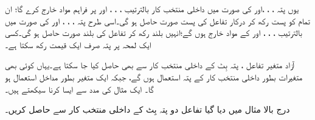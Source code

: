 یوں پتہ ، ، ،اور   کی صورت میں  داخلی منتخب کار بالترتیب  ، ، ، اور     پر فراہم مواد     خارج کرے گا؛ ان تمام کو پست رکھ کر درکار تفاعل کی پست صورت حاصل ہو گی۔اسی طرح پتہ ، ، ،  اور   کی صورت میں  بالترتیب ، ، ، اور  کے مواد   خارج ہوں گے؛انہیں بلند رکھ کر  تفاعل کی بلند صورت حاصل ہو گی۔کسی ایک  لمحہ  پر  پتہ  صرف ایک  قیمت رکھ سکتا  ہے۔

   آزاد متغیر  تفاعل  ،  پتہ بِٹ کے  داخلی منتخب کار سے بھی   حاصل کیا جا سکتا ہے۔یہاں     کوئی  بھی   متغیرات بطور داخلی منتخب کار کے پتہ استعمال  ہوں گے،  جبکہ  ایک متغیر  بطور مداخل استعمال ہو گا۔ ایک مثال کی مدد سے  ایسا کرنا سیکھتے   ہیں۔


  درج بالا مثال میں دیا گیا   تفاعل    دو پتہ بِٹ  کے    داخلی منتخب کار  سے حاصل کریں۔


